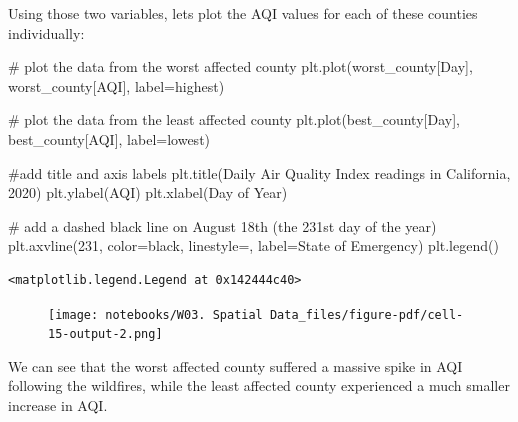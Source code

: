 \documentclass[
  letterpaper,
  DIV=11,
  numbers=noendperiod]{scrreprt}
\newenvironment{Shaded}{\begin{snugshade}}{\end{snugshade}}
\newcommand{\CommentTok}[1]{\textcolor[rgb]{0.37,0.37,0.37}{#1}}
\newcommand{\DecValTok}[1]{\textcolor[rgb]{0.68,0.00,0.00}{#1}}
\newcommand{\NormalTok}[1]{\textcolor[rgb]{0.00,0.23,0.31}{#1}}
\newcommand{\OperatorTok}[1]{\textcolor[rgb]{0.37,0.37,0.37}{#1}}
\newcommand{\StringTok}[1]{\textcolor[rgb]{0.13,0.47,0.30}{#1}}
\begin{document}
Using those two variables, lets plot the AQI values for each of these
counties individually:

\begin{Shaded}
\begin{Highlighting}[]
\CommentTok{\# plot the data from the worst affected county}
\NormalTok{plt.plot(worst\_county[}\StringTok{\textquotesingle{}Day\textquotesingle{}}\NormalTok{], worst\_county[}\StringTok{\textquotesingle{}AQI\textquotesingle{}}\NormalTok{], label}\OperatorTok{=}\NormalTok{highest)}

\CommentTok{\# plot the data from the least affected county}
\NormalTok{plt.plot(best\_county[}\StringTok{\textquotesingle{}Day\textquotesingle{}}\NormalTok{], best\_county[}\StringTok{\textquotesingle{}AQI\textquotesingle{}}\NormalTok{], label}\OperatorTok{=}\NormalTok{lowest)}

\CommentTok{\#add title and axis labels}
\NormalTok{plt.title(}\StringTok{\textquotesingle{}Daily Air Quality Index readings in California, 2020\textquotesingle{}}\NormalTok{)}
\NormalTok{plt.ylabel(}\StringTok{\textquotesingle{}AQI\textquotesingle{}}\NormalTok{)}
\NormalTok{plt.xlabel(}\StringTok{\textquotesingle{}Day of Year\textquotesingle{}}\NormalTok{)}

\CommentTok{\# add a dashed black line on August 18th (the 231st day of the year)}
\NormalTok{plt.axvline(}\DecValTok{231}\NormalTok{, color}\OperatorTok{=}\StringTok{\textquotesingle{}black\textquotesingle{}}\NormalTok{, linestyle}\OperatorTok{=}\StringTok{\textquotesingle{}{-}{-}\textquotesingle{}}\NormalTok{, label}\OperatorTok{=}\StringTok{\textquotesingle{}State of Emergency\textquotesingle{}}\NormalTok{)}
\NormalTok{plt.legend()}
\end{Highlighting}
\end{Shaded}

\begin{verbatim}
<matplotlib.legend.Legend at 0x142444c40>
\end{verbatim}

\begin{figure}[H]

{\centering \texttt{[image: notebooks/W03. Spatial Data\_files/figure-pdf/cell-15-output-2.png]}

}

\end{figure}

We can see that the worst affected county suffered a massive spike in
AQI following the wildfires, while the least affected county experienced
a much smaller increase in AQI.
\end{document}
